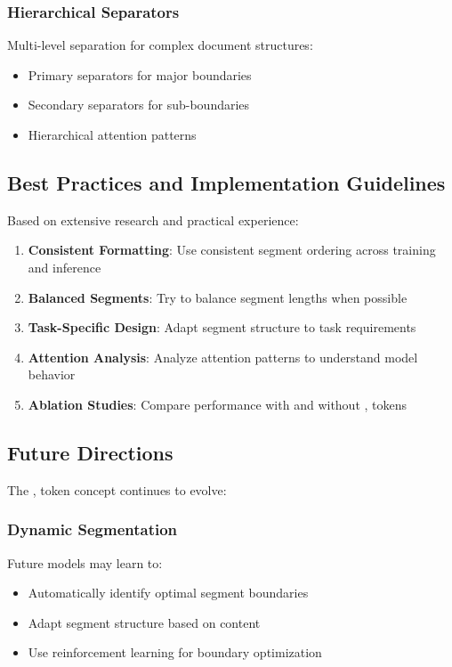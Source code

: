 \subsubsection{Hierarchical Separators}
Multi-level separation for complex document structures:
\begin{itemize}
\item Primary separators for major boundaries
\item Secondary separators for sub-boundaries
\item Hierarchical attention patterns
\end{itemize}

\subsection{Best Practices and Implementation Guidelines}

Based on extensive research and practical experience:

\begin{principle}
\begin{enumerate}
\item \textbf{Consistent Formatting}: Use consistent segment ordering across training and inference
\item \textbf{Balanced Segments}: Try to balance segment lengths when possible
\item \textbf{Task-Specific Design}: Adapt segment structure to task requirements
\item \textbf{Attention Analysis}: Analyze attention patterns to understand model behavior
\item \textbf{Ablation Studies}: Compare performance with and without \sep{} tokens
\end{enumerate}
\end{principle}

\subsection{Future Directions}

The \sep{} token concept continues to evolve:

\subsubsection{Dynamic Segmentation}
Future models may learn to:
\begin{itemize}
\item Automatically identify optimal segment boundaries
\item Adapt segment structure based on content
\item Use reinforcement learning for boundary optimization
\end{itemize}


